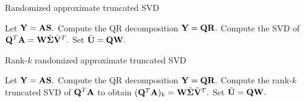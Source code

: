 % 
\begin{algorithm}[tb!]
 \caption{Randomized approximate truncated SVD}
 \label{ch3:alg:nonfixedrank-randomized-svd}
 \algrenewcommand{}
 \algrenewcommand{}
 \begin{algorithmic}[1]
  \Statex
  
 \State Let $\mathbf{Y} = \mathbf{A} \mathbf{S}.$
 \State Compute the QR decomposition $\mathbf{Y} = \mathbf{Q} \mathbf{R}.$
 \State Compute the SVD of $\mathbf{Q}^T \mathbf{A} = \mathbf{W} \tilde{\mathbf{\Sigma}} \tilde{\mathbf{V}}^T.$
 \State Set $\tilde{\mathbf{U}} = \mathbf{Q} \mathbf{W}.$
\end{algorithmic}
\end{algorithm}

\begin{algorithm}[tb!]
 \caption{Rank-$k$ randomized approximate truncated SVD}
 \label{ch3:alg:fixedrank-randomized-svd}
 \algrenewcommand{}
 \algrenewcommand{}
 \begin{algorithmic}[1]
  \Statex
  
 \State Let $\mathbf{Y} = \mathbf{A} \mathbf{S}.$
 \State Compute the QR decomposition $\mathbf{Y} = \mathbf{Q} \mathbf{R}.$
 \State Compute the rank-$k$ truncated SVD of $\mathbf{Q}^T \mathbf{A}$ to
        obtain $(\mathbf{Q}^T\mathbf{A})_k = \mathbf{W} 
        \tilde{\mathbf{\Sigma}} \tilde{\mathbf{V}}^T.$
 \State Set $\tilde{\mathbf{U}} = \mathbf{Q} \mathbf{W}.$
\end{algorithmic}
\end{algorithm}

